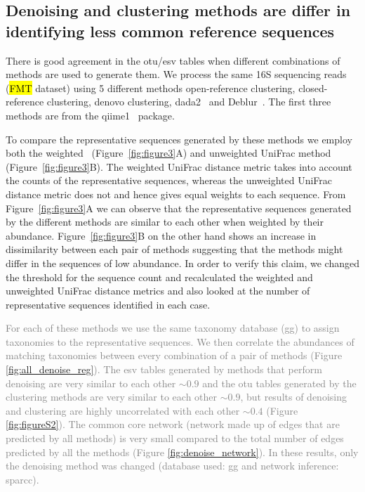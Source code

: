   \FloatBarrier

  \subsection*{Denoising and clustering methods are differ in identifying less common reference sequences}

  There is good agreement in the \ac{otu}/\ac{esv} tables when different combinations of methods are used to generate them.
  We process the same 16S sequencing reads (\hl{FMT} dataset) using 5 different methods \- open-reference clustering, closed-reference clustering, denovo clustering, \ac{dada2}~\cite{Callahan2016} and Deblur~\cite{Amir2017}.
  The first three methods are from the \ac{qiime1}~\cite{Caporaso2010} package.

  To compare the representative sequences generated by these methods we employ both the weighted~\cite{Lozupone2007} (Figure~\ref{fig:figure3}A) and unweighted UniFrac method~\cite{Lozupone2005} (Figure~\ref{fig:figure3}B).
  The weighted UniFrac distance metric takes into account the counts of the representative sequences, whereas the unweighted UniFrac distance metric does not and hence gives equal weights to each sequence.
  From Figure~\ref{fig:figure3}A we can observe that the representative sequences generated by the different methods are similar to each other when weighted by their abundance.
  Figure~\ref{fig:figure3}B on the other hand shows an increase in dissimilarity between each pair of methods suggesting that the methods might differ in the sequences of low abundance.
  In order to verify this claim, we changed the threshold for the sequence count and recalculated the weighted and unweighted UniFrac distance metrics and also looked at the number of representative sequences identified in each case. 

  \textcolor{gray}{
    For each of these methods we use the same taxonomy database (\ac{gg}) to assign taxonomies to the representative sequences.
    We then correlate the abundances of matching taxonomies between every combination of a pair of methods (Figure \ref{fig:all_denoise_reg}).
    The \ac{esv} tables generated by methods that perform denoising are very similar to each other $\sim0.9$ and the \ac{otu} tables generated by the clustering methods are very similar to each other $\sim0.9$, but results of denoising and clustering are highly uncorrelated with each other $\sim0.4$ (Figure \ref{fig:figureS2}).
    The common core network (network made up of edges that are predicted by all methods) is very small compared to the total number of edges predicted by all the methods (Figure \ref{fig:denoise_network}).
    In these results, only the denoising method was changed (database used: \ac{gg} and network inference: \ac{sparcc}).
  }

